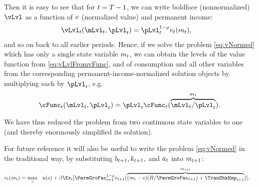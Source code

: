 \documentclass[SolvingMicroDSOPs]{subfiles}
\begin{document}
Then it is easy to see that for $t=T-1$, we can write boldface (nonnormalized) $\vLvl$ as a function of $v$ (normalized value) and permanent income:
\begin{equation}\begin{gathered}\begin{aligned}
      \vLvl_{\prd}(\mLvl_{\prd},\pLvl_{\prd}) & =  \pLvl_{\prd}^{1-\CRRA}\vFunc_{\prdt}(\mNrm_{\prdt}), \label{eq:vLvlFromvFunc}
    \end{aligned}\end{gathered}\end{equation}
and so on back to all earlier periods.  Hence, if we solve the problem \eqref{eq:vNormed} which has only a single state variable $m_{t}$, we can obtain the levels of the value function from \eqref{eq:vLvlFromvFunc}, and of consumption and all other variables from the corresponding permanent-income-normalized solution objects by multiplying each by $\pLvl_{\prd}$, e.g.\
\begin{equation*}\begin{gathered}\begin{aligned}
  \cFunc_{\prd}(\mLvl_{\prd},\pLvl_{\prd})=\pLvl_{\prd}\cFunc_{\prd}(\overbrace{\mLvl_{\prd}/\pLvl_{\prd}}^{\mNrm_{\prd}}).
    \end{aligned}\end{gathered}\end{equation*}

We have thus reduced the problem from two continuous state variables to one (and thereby enormously simplified its solution).

For future reference it will also be useful to write the problem \eqref{eq:vNormed} in the traditional way, by substituting $b_{t+1},k_{t+1},$ and $a_{t}$ into $m_{t+1}$:
\begin{equation}\begin{gathered}\begin{aligned}
      \vFunc_{\prdt}(\mNrm_{\prdt}) & = \max_{\cNrm} ~~ \uFunc(\cNrm)+ \DiscFac \Ex_{\prdt}[ \PermGroFac_{\prdt+1}^{1-\CRRA}\vFunc_{\prdt+1}(\overbrace{(\mNrm_{t}-\cNrm)(\Rfree/\PermGroFac_{t+1})+\TranShkEmp_{t+1}}^{m_{t+1}})] \label{eq:vusual}.
    \end{aligned}\end{gathered}\end{equation}
\end{document}

